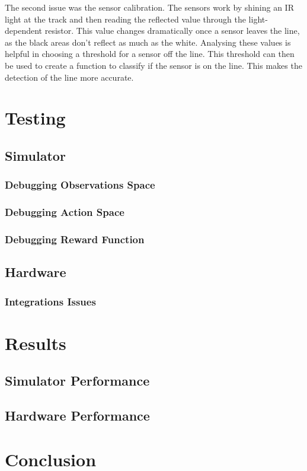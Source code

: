 \documentclass[a4paper,11pt]{article}
\begin{document}
The second issue was the sensor calibration. The sensors work by shining an IR light at the track and then reading the reflected value through the light-dependent resistor. This value changes dramatically once a sensor leaves the line, as the black areas don't reflect as much as the white. Analysing these values is helpful in choosing a threshold for a sensor off the line. This threshold can then be used to create a function to classify if the sensor is on the line. This makes the detection of the line more accurate. 

\section{Testing}

\subsection{Simulator}
\subsubsection{Debugging Observations Space}
\subsubsection{Debugging Action Space}
\subsubsection{Debugging Reward Function}


\subsection{Hardware}
\subsubsection{Integrations Issues}


\section{Results}

\subsection{Simulator Performance}
\subsection{Hardware Performance}


\section{Conclusion}

\pagebreak

\printbibliography
\end{document}
